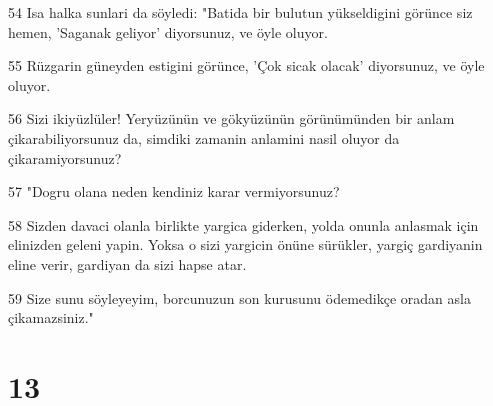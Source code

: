 \par 54 Isa halka sunlari da söyledi: "Batida bir bulutun yükseldigini görünce siz hemen, 'Saganak geliyor' diyorsunuz, ve öyle oluyor.
\par 55 Rüzgarin güneyden estigini görünce, 'Çok sicak olacak' diyorsunuz, ve öyle oluyor.
\par 56 Sizi ikiyüzlüler! Yeryüzünün ve gökyüzünün görünümünden bir anlam çikarabiliyorsunuz da, simdiki zamanin anlamini nasil oluyor da çikaramiyorsunuz?
\par 57 "Dogru olana neden kendiniz karar vermiyorsunuz?
\par 58 Sizden davaci olanla birlikte yargica giderken, yolda onunla anlasmak için elinizden geleni yapin. Yoksa o sizi yargicin önüne sürükler, yargiç gardiyanin eline verir, gardiyan da sizi hapse atar.
\par 59 Size sunu söyleyeyim, borcunuzun son kurusunu ödemedikçe oradan asla çikamazsiniz."

\chapter{13}


